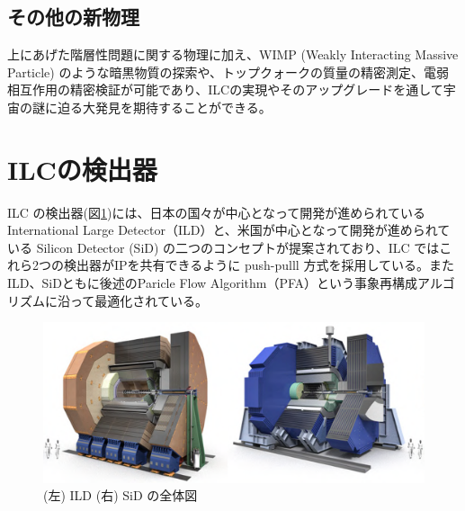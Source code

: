 \subsection{その他の新物理}
上にあげた階層性問題に関する物理に加え、WIMP (Weakly Interacting Massive Particle) のような暗黒物質の探索や、トップクォークの質量の精密測定、電弱相互作用の精密検証が可能であり、ILCの実現やそのアップグレードを通して宇宙の謎に迫る大発見を期待することができる。
\section{ILCの検出器}
ILC の検出器(図\ref{detector})には、日本の国々が中心となって開発が進められている International Large Detector（ILD）と、米国が中心となって開発が進められている Silicon Detector (SiD) の二つのコンセプトが提案されており、ILC ではこれら2つの検出器がIPを共有できるように push-pulll 方式を採用している。またILD、SiDともに後述のParicle Flow Algorithm（PFA）という事象再構成アルゴリズムに沿って最適化されている。
\begin{figure}[h]
	\begin{center}
 \includegraphics[keepaspectratio, scale=0.4]
 	{Figure/Introduction/detector.png}
 		\caption{(左) ILD (右) SiD の全体図}
 		\label{detector}
	\end{center}
\end{figure}
